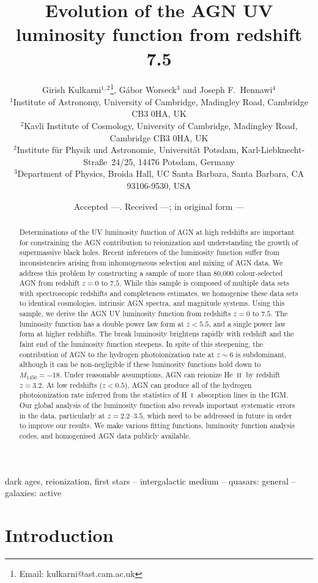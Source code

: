 \documentclass[fleqn,usenatbib]{mnras}
\title[AGN luminosity function]{Evolution of the AGN UV
  luminosity function from redshift 7.5}
\author[Kulkarni et al.]
       {{Girish Kulkarni$^{1,2}$\thanks{Email: kulkarni@ast.cam.ac.uk},
           G\'abor Worseck$^{3}$
           and Joseph F.~Hennawi$^{4}$} \\
         $^1$Institute of Astronomy,
         University of Cambridge, Madingley Road, Cambridge CB3 0HA,
         UK \\
         $^2$Kavli Institute of Cosmology,
         University of Cambridge, Madingley Road, Cambridge CB3 0HA,
         UK \\
         $^2$Institute f\"ur Physik und Astronomie, Universit\"at
         Potsdam, Karl-Liebknecht-Stra\ss e\ 24/25, 14476 Potsdam,
         Germany \\
         $^3$Department of Physics, Broida Hall, UC Santa Barbara,
         Santa Barbara, CA 93106-9530, USA}
\date{Accepted ---. Received ---; in original form ---}
\def\HI{\hbox{H~$\scriptstyle\rm I$}}
\def\HeII{\hbox{He~$\scriptstyle\rm II$}}
\begin{document}
\label{firstpage}
\pagerange{\pageref{firstpage}--\pageref{lastpage}}
\maketitle

\begin{abstract}
  Determinations of the UV luminosity function of AGN at high
  redshifts are important for constraining the AGN contribution to
  reionization and understanding the growth of supermassive black
  holes.  Recent inferences of the luminosity function suffer from
  inconsistencies arising from inhomogeneous selection and mixing of
  AGN data.  We address this problem by constructing a sample of more
  than 80,000 colour-selected AGN from redshift $z=0$ to $7.5$.  While
  this sample is composed of multiple data sets with spectroscopic
  redshifts and completeness estimates, we homogenise these data sets
  to identical cosmologies, intrinsic AGN spectra, and magnitude
  systems.  Using this sample, we derive the AGN UV luminosity
  function from redshifts $z=0$ to $7.5$.  The luminosity function has
  a double power law form at $z<5.5$, and a single power law form at
  higher redshifts.  The break luminosity brightens rapidly with
  redshift and the faint end of the luminosity function steepens.  In
  spite of this steepening, the contribution of AGN to the hydrogen
  photoionization rate at $z\sim 6$ is subdominant, although it can be
  non-negligible if these luminosity functions hold down to
  $M_{1450}=-18$.  Under reasonable assumptions, AGN can reionize
  \HeII\ by redshift $z=3.2$.  At low redshifts ($z<0.5$), AGN can
  produce all of the hydrogen photoionization rate inferred from the
  statistics of \HI\ absorption lines in the IGM.  Our global analysis
  of the luminosity function also reveals important systematic errors
  in the data, particularly at $z=2.2$--$3.5$, which need to be
  addressed in future in order to improve our results.  We make
  various fitting functions, luminosity function analysis codes, and
  homogenised AGN data publicly available.
\end{abstract}

\begin{keywords}
  dark ages, reionization, first stars -- intergalactic medium --
  quasars: general -- galaxies: active
\end{keywords}

\section{Introduction}
\end{document}
